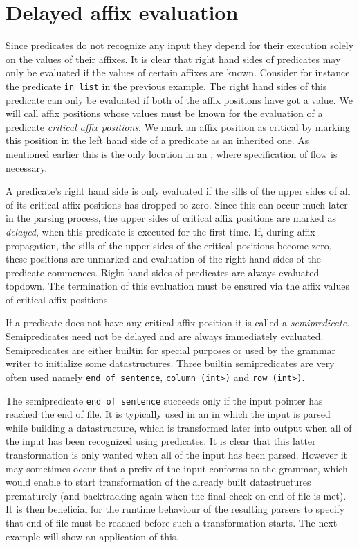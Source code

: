 \section {Delayed affix evaluation}
Since predicates do not recognize any input they depend for
their execution solely on the values of their affixes. It is
clear that right hand sides of predicates may only be evaluated
if the values of certain affixes are known. Consider for instance
the predicate {\tt in list} in the previous example. The right hand
sides of this predicate can only be evaluated if both of the affix
positions have got a value. We will call affix positions whose values
must be known for the evaluation of a predicate {\em critical affix
positions}. We mark an affix position as critical by marking this
position in the left hand side of a predicate as an inherited one.
As mentioned earlier this is the only location in an \EAGns, where
specification of flow is necessary.

A predicate's right hand side is only evaluated if the sills of
the upper sides of all of its critical affix positions has
dropped to zero. Since this can occur much later in the parsing
process, the upper sides of critical affix positions are marked
as {\em delayed}, when this predicate is executed for the first
time. If, during affix propagation, the sills of the upper sides
of the critical positions become zero, these positions are
unmarked and evaluation of the right hand sides of the predicate
commences. Right hand sides of predicates are always evaluated
topdown. The termination of this evaluation must be ensured via
the affix values of critical affix positions.

If a predicate does not have any critical affix position it is
called a {\em semipredicate}. Semipredicates need not be delayed
and are always immediately evaluated. Semipredicates are either
builtin for special purposes or used by the grammar writer to
initialize some datastructures. Three builtin semipredicates are
very often used namely {\tt end of sentence},
\verb+column (int>)+ and \verb+row (int>)+.

The semipredicate \verb+end of sentence+ succeeds only if the
input pointer has reached the end of file. It is typically
used in an \EAG in which the input is parsed while building a
datastructure, which is transformed later into output when all of the
input has been recognized using predicates. It is clear that this
latter transformation is only wanted when all of the input has been
parsed. However it may sometimes occur that a prefix of the input
conforms to the grammar, which would enable to start transformation
of the already built datastructures prematurely (and backtracking
again when the final check on end of file is met).
It is then beneficial for the runtime behaviour of the
resulting parsers to specify that end of file must be
reached before such a transformation starts. The next example
will show an application of this.

